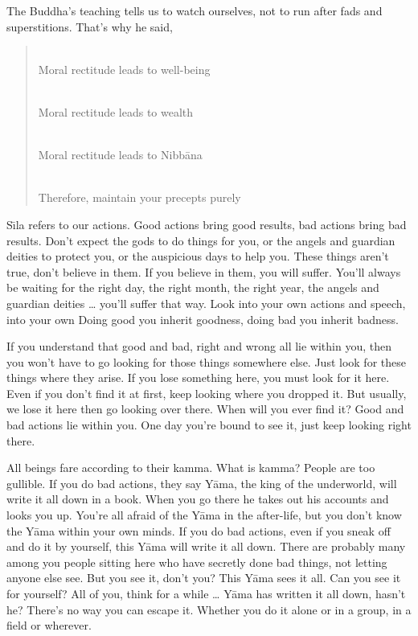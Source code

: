 The Buddha's teaching tells us to watch ourselves, not to run after fads and superstitions. That's why he said,

\begin{verse}
\\
Moral rectitude leads to well-being

\\
Moral rectitude leads to wealth

\\
Moral rectitude leads to Nibb\=ana

\\
Therefore, maintain your precepts purely
\end{verse}

S\={\i}la refers to our actions. Good actions bring good results, bad actions bring bad results. Don't expect the gods to do things for you, or the angels and guardian deities to protect you, or the auspicious days to help you. These things aren't true, don't believe in them. If you believe in them, you will suffer. You'll always be waiting for the right day, the right month, the right year, the angels and guardian deities \ldots{} you'll suffer that way. Look into your own actions and speech, into your own  Doing good you inherit goodness, doing bad you inherit badness.

If you understand that good and bad, right and wrong all lie within you, then you won't have to go looking for those things somewhere else. Just look for these things where they arise. If you lose something here, you must look for it here. Even if you don't find it at first, keep looking where you dropped it. But usually, we lose it here then go looking over there. When will you ever find it? Good and bad actions lie within you. One day you're bound to see it, just keep looking right there.

All beings fare according to their kamma. What is kamma? People are too gullible. If you do bad actions, they say Y\=ama, the king of the underworld, will write it all down in a book. When you go there he takes out his accounts and looks you up. You're all afraid of the Y\=ama in the after-life, but you don't know the Y\=ama within your own minds. If you do bad actions, even if you sneak off and do it by yourself, this Y\=ama will write it all down. There are probably many among you people sitting here who have secretly done bad things, not letting anyone else see. But you see it, don't you? This Y\=ama sees it all. Can you see it for yourself? All of you, think for a while \ldots{} Y\=ama has written it all down, hasn't he? There's no way you can escape it. Whether you do it alone or in a group, in a field or wherever.

